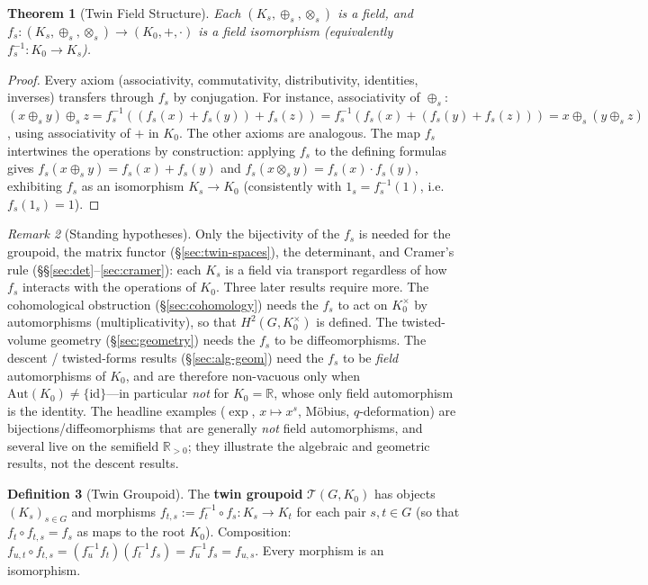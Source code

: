 \documentclass[11pt,twocolumn]{article}
\theoremstyle{plain}
\newtheorem{theorem}{Theorem}
\theoremstyle{definition}
\newtheorem{definition}[theorem]{Definition}
\theoremstyle{remark}
\newtheorem{remark}[theorem]{Remark}
\begin{document}
\begin{theorem}[Twin Field Structure]\label{thm:twin-structure}
Each $(K_s, \oplus_s, \otimes_s)$ is a field, and $f_s: (K_s, \oplus_s, \otimes_s) \to (K_0, +, \cdot)$ is a field isomorphism (equivalently $f_s^{-1}: K_0 \to K_s$).
\end{theorem}

\begin{proof}
Every axiom (associativity, commutativity, distributivity, identities, inverses) transfers through $f_s$ by conjugation. For instance, associativity of $\oplus_s$: $(x \oplus_s y) \oplus_s z = f_s^{-1}((f_s(x) + f_s(y)) + f_s(z)) = f_s^{-1}(f_s(x) + (f_s(y) + f_s(z))) = x \oplus_s (y \oplus_s z)$, using associativity of $+$ in $K_0$. The other axioms are analogous. The map $f_s$ intertwines the operations by construction: applying $f_s$ to the defining formulas gives $f_s(x \oplus_s y) = f_s(x) + f_s(y)$ and $f_s(x \otimes_s y) = f_s(x) \cdot f_s(y)$, exhibiting $f_s$ as an isomorphism $K_s \to K_0$ (consistently with $1_s = f_s^{-1}(1)$, i.e.\ $f_s(1_s) = 1$).
\end{proof}

\begin{remark}[Standing hypotheses]\label{rem:hypotheses}
Only the bijectivity of the $f_s$ is needed for the groupoid, the matrix functor (\S\ref{sec:twin-spaces}), the determinant, and Cramer's rule (\S\S\ref{sec:det}--\ref{sec:cramer}): each $K_s$ is a field via transport regardless of how $f_s$ interacts with the operations of $K_0$. Three later results require more. The cohomological obstruction (\S\ref{sec:cohomology}) needs the $f_s$ to act on $K_0^\times$ by automorphisms (multiplicativity), so that $H^2(G, K_0^\times)$ is defined. The twisted-volume geometry (\S\ref{sec:geometry}) needs the $f_s$ to be diffeomorphisms. The descent / twisted-forms results (\S\ref{sec:alg-geom}) need the $f_s$ to be \emph{field} automorphisms of $K_0$, and are therefore non-vacuous only when $\mathrm{Aut}(K_0) \neq \{\mathrm{id}\}$---in particular \emph{not} for $K_0 = \mathbb{R}$, whose only field automorphism is the identity. The headline examples ($\exp$, $x \mapsto x^s$, M\"obius, $q$-deformation) are bijections/diffeomorphisms that are generally \emph{not} field automorphisms, and several live on the semifield $\mathbb{R}_{>0}$; they illustrate the algebraic and geometric results, not the descent results.
\end{remark}

\begin{definition}[Twin Groupoid]\label{def:groupoid}
The \textbf{twin groupoid} $\mathcal{T}(G, K_0)$ has objects $(K_s)_{s \in G}$ and morphisms $f_{t,s} := f_t^{-1} \circ f_s: K_s \to K_t$ for each pair $s, t \in G$ (so that $f_t \circ f_{t,s} = f_s$ as maps to the root $K_0$). Composition: $f_{u,t} \circ f_{t,s} = (f_u^{-1} f_t)(f_t^{-1} f_s) = f_u^{-1} f_s = f_{u,s}$. Every morphism is an isomorphism.
\end{definition}
\end{document}
